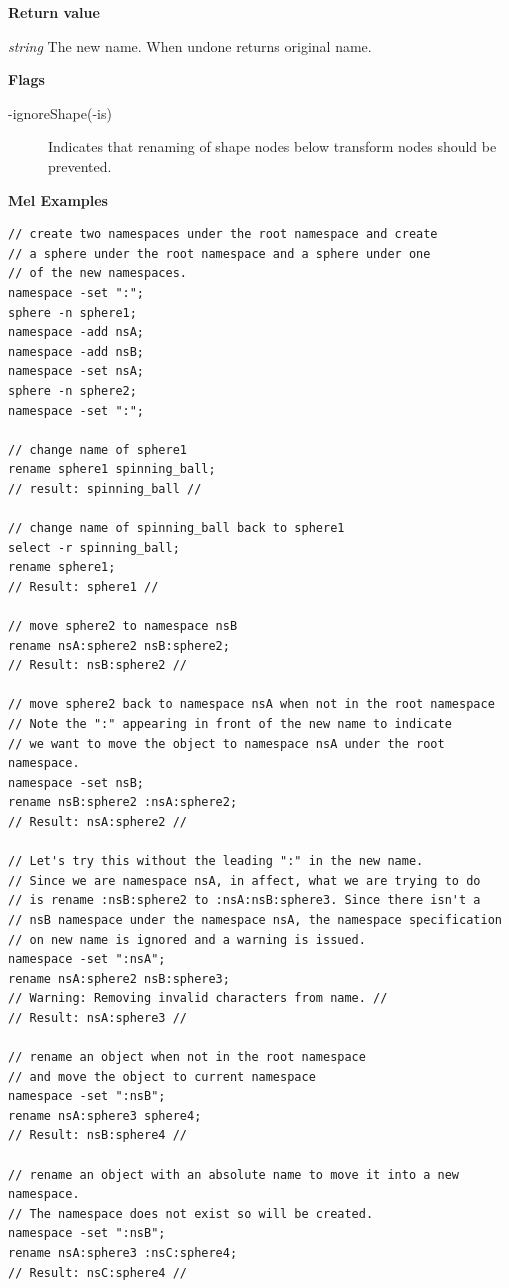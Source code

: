 \textbf{Return value}


\textit{string}	The new name. When undone returns original name.


\textbf{Flags}
\begin{description}
	\item[-ignoreShape(-is)] 	Indicates that renaming of shape nodes below transform nodes should be prevented.
\end{description}

\textbf{Mel Examples}
\begin{lstlisting}
// create two namespaces under the root namespace and create
// a sphere under the root namespace and a sphere under one
// of the new namespaces.
namespace -set ":";
sphere -n sphere1;
namespace -add nsA;
namespace -add nsB;
namespace -set nsA;
sphere -n sphere2;
namespace -set ":";

// change name of sphere1
rename sphere1 spinning_ball;
// result: spinning_ball //

// change name of spinning_ball back to sphere1
select -r spinning_ball;
rename sphere1;
// Result: sphere1 //

// move sphere2 to namespace nsB
rename nsA:sphere2 nsB:sphere2;
// Result: nsB:sphere2 //

// move sphere2 back to namespace nsA when not in the root namespace
// Note the ":" appearing in front of the new name to indicate
// we want to move the object to namespace nsA under the root namespace.
namespace -set nsB;
rename nsB:sphere2 :nsA:sphere2;
// Result: nsA:sphere2 //

// Let's try this without the leading ":" in the new name.
// Since we are namespace nsA, in affect, what we are trying to do
// is rename :nsB:sphere2 to :nsA:nsB:sphere3. Since there isn't a
// nsB namespace under the namespace nsA, the namespace specification
// on new name is ignored and a warning is issued.
namespace -set ":nsA";
rename nsA:sphere2 nsB:sphere3;
// Warning: Removing invalid characters from name. //
// Result: nsA:sphere3 //

// rename an object when not in the root namespace
// and move the object to current namespace
namespace -set ":nsB";
rename nsA:sphere3 sphere4;
// Result: nsB:sphere4 //

// rename an object with an absolute name to move it into a new namespace.
// The namespace does not exist so will be created.
namespace -set ":nsB";
rename nsA:sphere3 :nsC:sphere4;
// Result: nsC:sphere4 //
\end{lstlisting}

